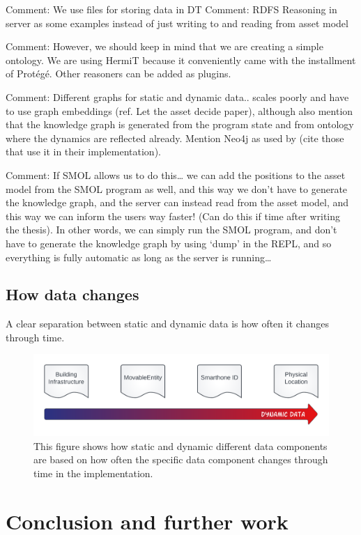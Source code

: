 \documentclass{article}
\begin{document}
Comment: We use files for storing data in DT
Comment: RDFS Reasoning in server as some examples instead of just writing to and reading from asset model

Comment: However, we should keep in mind that we are creating a simple ontology. We are using HermiT because it conveniently came with the installment of Protégé. Other reasoners can be added as plugins.

Comment: Different graphs for static and dynamic data.. scales poorly and have to use graph embeddings (ref. Let the asset decide paper), although also mention that the knowledge graph is generated from the program state and from ontology where the dynamics are reflected already. Mention Neo4j as used by (cite those that use it in their implementation).

Comment: If SMOL allows us to do this… we can add the positions to the asset model from the SMOL program as well, and this way we don't have to generate the knowledge graph, and the server can instead read from the asset model, and this way we can inform the users way faster! (Can do this if time after writing the thesis). In other words, we can simply run the SMOL program, and don’t have to generate the knowledge graph by using ‘dump’ in the REPL, and so everything is fully automatic as long as the server is running…

\subsection{How data changes}
A clear separation between static and dynamic data is how often it changes through time. 

\begin{figure}
    \centering
    \includegraphics[scale=0.16]{graphics/dynamic_arrow.png}
    \caption{This figure shows how static and dynamic different data components are based on how often the specific data component changes through time in the implementation.}
    \label{fig:my_label}
\end{figure}


\newpage
\section{Conclusion and further work}\label{sec:Conclusion}
\end{document}
